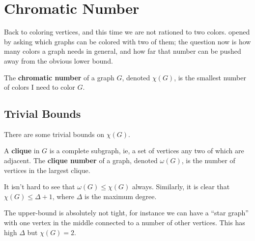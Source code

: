 \section{Chromatic Number}

Back to coloring vertices, and this time we are not rationed to two colors.  opened by asking which graphs can be colored with two of them; the question now is how many colors a graph needs in general, and how far that number can be pushed away from the obvious lower bound.

\begin{boxdefinition} \label{Ch1:Def:Chromatic_Number}
    The \textbf{chromatic number} of a graph $G$, denoted $\chi(G)$, is the smallest number of colors I need to color $G$.
\end{boxdefinition}

\subsection{Trivial Bounds}

There are some trivial bounds on $\chi(G)$.

\begin{boxdefinition}[Clique]
    A \textbf{clique} in $G$ is a complete subgraph, ie, a set of vertices any two of which are adjacent. The \textbf{clique number} of a graph, denoted $\omega(G)$, is the number of vertices in the largest clique.
\end{boxdefinition}

It isn't hard to see that $\omega(G) \leq \chi(G)$ always. Similarly, it is clear that $\chi(G) \leq \Delta + 1$, where $\Delta$ is the maximum degree.

The upper-bound is absolutely not tight, for instance we can have a ``star graph'' with one vertex in the middle connected to a number of other vertices. This has high $\Delta$ but $\chi(G) = 2$.

\begin{figure}[H]
    \centering
\end{figure}

